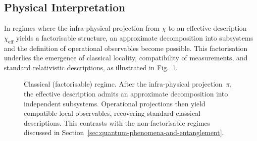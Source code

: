 \subsection{Physical Interpretation}
  \label{subsec:physical-interpretation}

  In regimes where the infra-physical projection from $\chi$ to an effective
  description~$\chi_{\mathrm{eff}}$ yields a factorisable structure, an
  approximate decomposition into subsystems and the definition of operational
  observables become possible.
  This factorisation underlies the emergence of classical locality,
  compatibility of measurements, and standard relativistic descriptions, as
  illustrated in Fig.~\ref{fig:classical-factorisable}.

  \begin{figure}[t]
    \centering
    \caption{Classical (factorisable) regime.
    After the infra-physical projection~$\pi$, the effective description
    admits an approximate decomposition into independent subsystems.
    Operational projections then yield compatible local observables,
      recovering standard classical descriptions.
      This contrasts with the non-factorisable regimes discussed in
      Section~\ref{sec:quantum-phenomena-and-entanglement}.}
    \label{fig:classical-factorisable}
  \end{figure}


